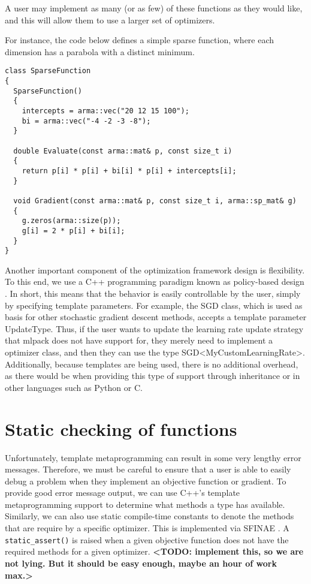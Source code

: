 \documentclass{article}
\begin{document}
A user may implement as many (or as few) of these functions as they would like,
and this will allow them to use a larger set of optimizers.

{\bf <TODO: add very simple example function>}


For instance, the code below defines a simple sparse function, where each
dimension has a parabola with a distinct minimum.

\lstset{language=C++}
\begin{lstlisting}
class SparseFunction
{
  SparseFunction()
  {
    intercepts = arma::vec("20 12 15 100");
    bi = arma::vec("-4 -2 -3 -8");
  }

  double Evaluate(const arma::mat& p, const size_t i)
  {
    return p[i] * p[i] + bi[i] * p[i] + intercepts[i];
  }

  void Gradient(const arma::mat& p, const size_t i, arma::sp_mat& g)
  {
    g.zeros(arma::size(p));
    g[i] = 2 * p[i] + bi[i];
  }
}

\end{lstlisting}

Another important component of the optimization framework design is flexibility.
To this end, we use a C++ programming paradigm known as policy-based design
\cite{Alexandrescu2001}. In short, this means that the behavior is easily
controllable by the user, simply by specifying template parameters. For example,
the SGD class, which is used as basis for other stochastic gradient descent
methods, accepts a template parameter UpdateType. Thus, if the user wants to
update the learning rate update strategy that mlpack does not have support for,
they merely need to implement a optimizer class, and then they can use the type
SGD<MyCustomLearningRate>. Additionally, because templates are being used, there
is no additional overhead, as there would be when providing this type of support
through inheritance or in other languages such as Python or C.

\section{Static checking of functions}

{\bf <TODO: probably a better section title>}

Unfortunately, template metaprogramming can result in some very lengthy error
messages.  Therefore, we must be careful to ensure that a user is able to easily
debug a problem when they implement an objective function or gradient.  To
provide good error message output, we can use C++'s template metaprogramming
support to determine what methods a type has available.  Similarly, we can also
use static compile-time constants to denote the methods that are require by a
specific optimizer.  This is implemented via SFINAE \cite{sfinae}.  A {\tt
static\_assert()} is raised when a given objective function does not have the
required methods for a given optimizer.  {\bf <TODO: implement this, so we are
not lying.  But it should be easy enough, maybe an hour of work max.>}
\end{document}
